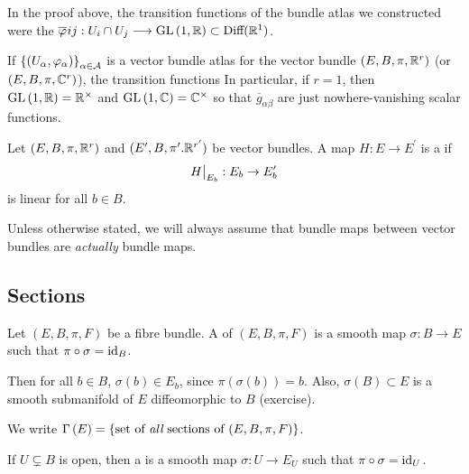 \documentclass[main.tex]{subfiles}
\begin{document}
\begin{note}
In the proof above, the transition functions of the bundle atlas we constructed were the $\overline{\varphi}_{}ij: U_i \cap U_j \longrightarrow \text{GL}\left( 1, \mathbb{R} \right) \subset \text{Diff}(\mathbb{R}^1)$.
\end{note}

\begin{rmk}
If $\left\{ \left(  U_\alpha, \varphi_\alpha  \right)\right\}_{\alpha \in \mathcal{A}}$ is a vector bundle atlas for the vector bundle $(E, B, \pi, \mathbb{R}^r)$ (or $(E, B, \pi, \mathbb{C}^r)$), the transition functions
 In particular, if $r=1$, then $\text{GL}\left( 1, \mathbb{R} \right) = \mathbb{R}^\times$ and $\text{GL}\left( 1, \mathbb{C} \right) = \mathbb{C}^\times$ so that $\overline{g}_{\alpha\beta}$ are just nowhere-vanishing scalar functions.
\end{rmk}

\begin{defn}
Let $(E, B, \pi, \mathbb{R}^r)$ and $(E^\prime, B, \pi^\prime. \mathbb{R}^{r^\prime})$ be vector bundles. A map $H: E \to E^\prime$ is a  if
\[
H\big|_{E_b} : E_b \to E_{b}^\prime
\]
is linear for all $b \in B$.
\end{defn}

\begin{note}
Unless otherwise stated, we will always assume that bundle maps between vector bundles are {\it actually} bundle maps.
\end{note}

\subsection{Sections}

\begin{defn}
Let $(E, B, \pi, F)$ be a fibre bundle. A  of $(E, B, \pi, F)$ is a smooth map $\sigma: B \to E$ such that $\pi \circ \sigma = \text{id}_{B}$.
\end{defn}

Then for all $b \in B$, $\sigma(b) \in E_b$, since $\pi(\sigma(b)) = b$. Also, $\sigma(B) \subset E$ is a smooth submanifold of $E$ diffeomorphic to $B$ (exercise).

\begin{notation}
We write $\Gamma\left( E \right) = \left\{ \text{set of {\it all} sections of $(E,B,\pi,F)$} \right\}$.
\end{notation}

\begin{defn}
If $U \subsetneq B$ is open, then a  is a smooth map $\sigma: U \to E_U$ such that $\pi \circ \sigma = \text{id}_{U}$.
\end{defn}
\end{document}
